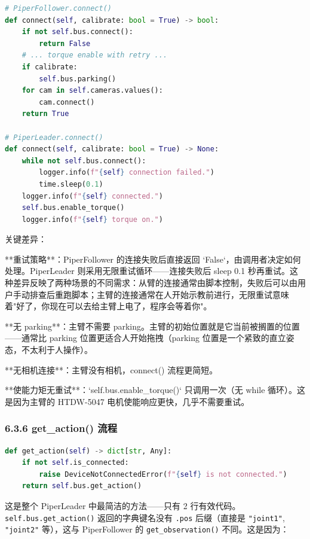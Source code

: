 \documentclass[UTF8,a4paper,11pt]{ctexart}
\begin{document}
{\begin{lstlisting}[language=python]
# PiperFollower.connect()
def connect(self, calibrate: bool = True) -> bool:
    if not self.bus.connect():
        return False
    # ... torque enable with retry ...
    if calibrate:
        self.bus.parking()
    for cam in self.cameras.values():
        cam.connect()
    return True

# PiperLeader.connect()
def connect(self, calibrate: bool = True) -> None:
    while not self.bus.connect():
        logger.info(f"{self} connection failed.")
        time.sleep(0.1)
    logger.info(f"{self} connected.")
    self.bus.enable_torque()
    logger.info(f"{self} torque on.")
\end{lstlisting}

关键差异：

\item[1] **重试策略**：PiperFollower 的连接失败后直接返回 `False`，由调用者决定如何处理。PiperLeader 则采用无限重试循环——连接失败后 sleep 0.1 秒再重试。这种差异反映了两种场景的不同需求：从臂的连接通常由脚本控制，失败后可以由用户手动排查后重跑脚本；主臂的连接通常在人开始示教前进行，无限重试意味着"好了，你现在可以去给主臂上电了，程序会等着你"。

\item[2] **无 parking**：主臂不需要 parking。主臂的初始位置就是它当前被搁置的位置——通常比 parking 位置更适合人开始拖拽（parking 位置是一个紧致的直立姿态，不太利于人操作）。

\item[3] **无相机连接**：主臂没有相机，connect() 流程更简短。

\item[4] **使能力矩无重试**：`self.bus.enable_torque()` 只调用一次（无 while 循环）。这是因为主臂的 HTDW-5047 电机使能响应更快，几乎不需要重试。

\subsubsection{6.3.6 get_action() 流程}

\begin{lstlisting}[language=python]
def get_action(self) -> dict[str, Any]:
    if not self.is_connected:
        raise DeviceNotConnectedError(f"{self} is not connected.")
    return self.bus.get_action()
\end{lstlisting}

这是整个 PiperLeader 中最简洁的方法——只有 2 行有效代码。\texttt{self.bus.get_action()} 返回的字典键名没有 \texttt{.pos} 后缀（直接是 \texttt{"joint1"}, \texttt{"joint2"} 等），这与 PiperFollower 的 \texttt{get_observation()} 不同。这是因为：

}
\end{document}
